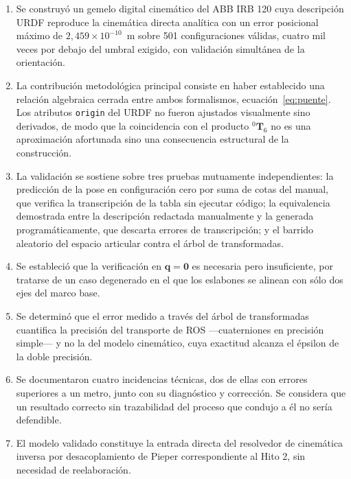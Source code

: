 \documentclass[11pt,a4paper]{article}
\newcommand{\T}[2]{{}^{#1}\mathbf{T}_{#2}}
\newcommand{\mat}[1]{\mathbf{#1}}
\begin{document}
\begin{enumerate}[leftmargin=*]

\item Se construyó un gemelo digital cinemático del ABB IRB 120 cuya
descripción URDF reproduce la cinemática directa analítica con un error
posicional máximo de $2{,}459\times10^{-10}$~m sobre 501 configuraciones
válidas, cuatro mil veces por debajo del umbral exigido, con validación
simultánea de la orientación.

\item La contribución metodológica principal consiste en haber
establecido una relación algebraica cerrada entre ambos formalismos,
ecuación~\eqref{eq:puente}. Los atributos \texttt{origin} del URDF no
fueron ajustados visualmente sino derivados, de modo que la coincidencia
con el producto $\T{0}{6}$ no es una aproximación afortunada sino una
consecuencia estructural de la construcción.

\item La validación se sostiene sobre tres pruebas mutuamente
independientes: la predicción de la pose en configuración cero por suma
de cotas del manual, que verifica la transcripción de la tabla sin
ejecutar código; la equivalencia demostrada entre la descripción
redactada manualmente y la generada programáticamente, que descarta
errores de transcripción; y el barrido aleatorio del espacio articular
contra el árbol de transformadas.

\item Se estableció que la verificación en $\mat{q} = \mat{0}$ es
necesaria pero insuficiente, por tratarse de un caso degenerado en el
que los eslabones se alinean con sólo dos ejes del marco base.

\item Se determinó que el error medido a través del árbol de
transformadas cuantifica la precisión del transporte de ROS
—cuaterniones en precisión simple— y no la del modelo cinemático, cuya
exactitud alcanza el épsilon de la doble precisión.

\item Se documentaron cuatro incidencias técnicas, dos de ellas con
errores superiores a un metro, junto con su diagnóstico y corrección. Se
considera que un resultado correcto sin trazabilidad del proceso que
condujo a él no sería defendible.

\item El modelo validado constituye la entrada directa del resolvedor de
cinemática inversa por desacoplamiento de Pieper correspondiente al
Hito 2, sin necesidad de reelaboración.

\end{enumerate}
\end{document}
